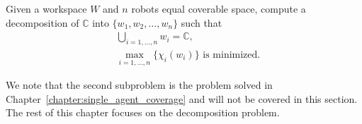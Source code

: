 \documentclass[../main.tex]{subfiles}
\begin{document}
\begin{problem}
\label{problem:workspace_allocation}
	Given a workspace $W$ and $n$ robots equal coverable space, compute a decomposition of $\mathbb{C}$ into $\{w_1,w_2,\dots,w_n\}$ such that
	\begin{equation}
	\begin{aligned}
		& \bigcup_{i=1,\dots,n}w_i=\mathbb{C},\\
		& \max_{i=1,\ldots,n}\{\chi_i(w_i)\}\text{ is minimized.}
	\end{aligned}
	\end{equation}
\end{problem}

We note that the second subproblem is the problem solved in Chapter~\ref{chapter:single_agent_coverage} and will not be covered in this section. The rest of this chapter focuses on the decomposition problem.



\end{document}
